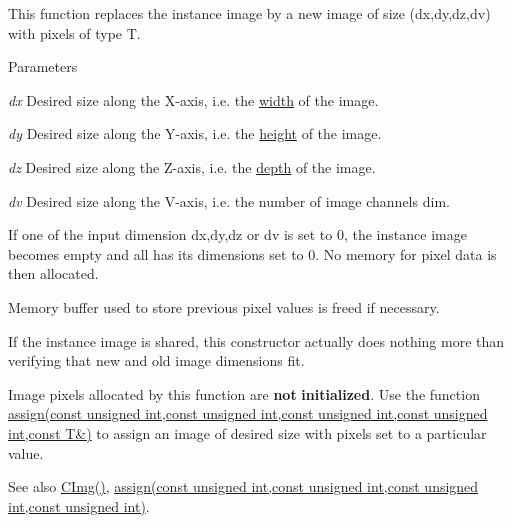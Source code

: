 This function replaces the instance image by a new image of size ({\ttfamily dx},{\ttfamily dy},{\ttfamily dz},{\ttfamily dv}) with pixels of type {\ttfamily T}. 
\begin{DoxyParams}{Parameters}
\item[{\em dx}]Desired size along the X-\/axis, i.e. the \hyperlink{structcimg__library_1_1_c_img_a5fb74a7776210bb99fd6755319ade13f}{width} of the image. \item[{\em dy}]Desired size along the Y-\/axis, i.e. the \hyperlink{structcimg__library_1_1_c_img_a30d575fd18ae525e507315de71b4806a}{height} of the image. \item[{\em dz}]Desired size along the Z-\/axis, i.e. the \hyperlink{structcimg__library_1_1_c_img_a982d5d1e153477adf7f851106fe8ee3a}{depth} of the image. \item[{\em dv}]Desired size along the V-\/axis, i.e. the number of image channels {\ttfamily dim}.
\begin{DoxyItemize}
\item If one of the input dimension {\ttfamily dx},{\ttfamily dy},{\ttfamily dz} or {\ttfamily dv} is set to 0, the instance image becomes empty and all has its dimensions set to 0. No memory for pixel data is then allocated.
\item Memory buffer used to store previous pixel values is freed if necessary.
\item If the instance image is shared, this constructor actually does nothing more than verifying that new and old image dimensions fit.
\item Image pixels allocated by this function are {\bfseries not} {\bfseries initialized}. Use the function \hyperlink{structcimg__library_1_1_c_img_ac7f3c90ee5f43317abfbc6a7bb3d4ea6}{assign(const unsigned int,const unsigned int,const unsigned int,const unsigned int,const T\&)} to assign an image of desired size with pixels set to a particular value. 
\end{DoxyItemize}\end{DoxyParams}
\begin{DoxySeeAlso}{See also}
\hyperlink{structcimg__library_1_1_c_img_a76918ef9658da71040f29084bfe45de7}{CImg()}, \hyperlink{structcimg__library_1_1_c_img_a32e4857acca9063f247a025e163e41b8}{assign(const unsigned int,const unsigned int,const unsigned int,const unsigned int)}. 
\end{DoxySeeAlso}
